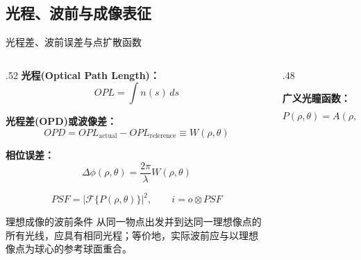 \subsection{光程、波前与成像表征}
\label{sec:1.2}

\begin{frame}{光程差、波前误差与点扩散函数}
\label{1.3}
    \begin{columns}[T]
        \begin{column}{.52\textwidth}
            \textbf{光程(Optical Path Length)：}
            \begin{equation}
                OPL = \int n(s)\,ds
                \label{eq:opl_main}
            \end{equation}

            \textbf{光程差(OPD)或波像差：}
            \begin{equation}
                OPD = OPL_{\text{actual}} - OPL_{\text{reference}}
                \equiv W(\rho,\theta)
                \label{eq:opd_main}
            \end{equation}

            \textbf{相位误差：}
            \begin{equation}
                \Delta\phi(\rho,\theta)
                = \frac{2\pi}{\lambda}W(\rho,\theta)
                \label{eq:phase_main}
            \end{equation}

            \begin{equation}
                PSF=\left|\mathcal{F}\{P(\rho,\theta)\}\right|^2,
                \qquad i=o\otimes PSF
                \label{eq:psf_conv_main}
            \end{equation}

            \begin{block}{理想成像的波前条件}
                从同一物点出发并到达同一理想像点的所有光线，应具有相同光程；等价地，实际波前应与以理想像点为球心的参考球面重合。
            \end{block}
        \end{column}
        \hfill
        \begin{column}{.48\textwidth}


            \textbf{广义光瞳函数：}
            \begin{equation}
                P(\rho,\theta)=A(\rho,\theta)
                \exp\!\left[i\frac{2\pi}{\lambda}W(\rho,\theta)\right]
                \label{eq:pupil_main}
            \end{equation}


\end{column}
\end{columns}
\end{frame}
